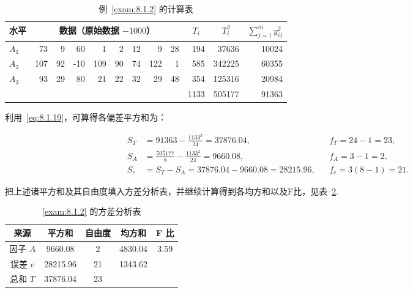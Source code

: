 \begin{table}[htbp]
  \centering
  \caption{例~\ref{exam:8.1.2} 的计算表}
    \begin{tabular}{rrrrrrrrrrrr}
    \toprule
    \multicolumn{1}{l}{水平} & \multicolumn{8}{c}{数据（原始数据 $-1000$）}                             & \multicolumn{1}{c}{$T_i$} & \multicolumn{1}{c}{$T_i^2$} & \multicolumn{1}{c}{$\sum_{j=1}^{m} y_{ij}^2$} \\
    \midrule
    \multicolumn{1}{l}{$A_1$} & 73    & 9     & 60    & 1     & 2     & 12    & 9     & 28    & 194   & 37636 & 10024 \\
    \multicolumn{1}{l}{$A_2$} & 107   & 92    & -10   & 109   & 90    & 74    & 122   & 1     & 585   & 342225 & 60355 \\
    \multicolumn{1}{l}{$A_3$} & 93    & 29    & 80    & 21    & 22    & 32    & 29    & 48    & 354   & 125316 & 20984 \\
    \midrule
          &       &       &       &       &       &       &       &       & 1133  & 505177 & 91363 \\
    \bottomrule
    \end{tabular}%
  \label{tab:8.1.4}%
\end{table}%

利用~\eqref{eq:8.1.19}，可算得各偏差平方和为：

\begin{align*}
S_T & = 91363 - \frac{1133^2}{24} = 37876.04, && f_T = 24-1=23,\\
S_A &= \frac{505177}{8} - \frac{1133^2}{24} = 9660.08, && f_A = 3 - 1 = 2,\\
S_e &= S_{T} - S_A = 37876.04 - 9660.08 = 28215.96, && f_{e} = 3(8-1)=21.
\end{align*}

把上述诸平方和及其自由度填入方差分析表，并继续计算得到各均方和以及F比，见表~\ref{tab:8.1.5}.

\begin{table}[htbp]
  \centering
  \caption{\ref{exam:8.1.2} 的方差分析表}
    \begin{tabular}{ccccc}
    \toprule
    来源    & 平方和   & 自由度   & 均方和   & F 比 \\
    \midrule
    因子 $A$  & 9660.08 & 2     & 4830.04 & 3.59 \\
    误差 $e$  & 28215.96 & 21    & 1343.62 &  \\
    总和 $T$  & 37876.04 & 23    &       &  \\
    \bottomrule
    \end{tabular}%
  \label{tab:8.1.5}%
\end{table}%



